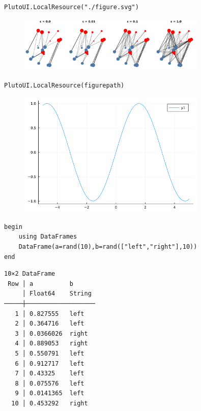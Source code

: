 \begin{lstlisting}[language=JuliaLocal, style=julia]
PlutoUI.LocalResource("./figure.svg")
\end{lstlisting}

\begin{figure}[H]
	\centering
	\includegraphics[width=0.8\textwidth]{./figures/figure}
	\label{fig:/home/davibarreira/MEGA/EMAp/NotebookToLatex.jl/test/pluto/./figure.svg}

\end{figure}

\begin{lstlisting}[language=JuliaLocal, style=julia]
PlutoUI.LocalResource(figurepath)
\end{lstlisting}

\begin{figure}[H]
	\centering
	\includegraphics[width=0.8\textwidth]{./figures/plotexample.png}
	\label{fig:/home/davibarreira/MEGA/EMAp/NotebookToLatex.jl/test/pluto/plotexample.png}

\end{figure}

\begin{lstlisting}[language=JuliaLocal, style=julia]
begin
	using DataFrames
	DataFrame(a=rand(10),b=rand(["left","right"],10))
end
\end{lstlisting}

\begin{verbatim}
10×2 DataFrame
 Row │ a          b
     │ Float64    String
─────┼───────────────────
   1 │ 0.827555   left
   2 │ 0.364716   left
   3 │ 0.0366026  right
   4 │ 0.889053   right
   5 │ 0.550791   left
   6 │ 0.912717   left
   7 │ 0.43325    left
   8 │ 0.075576   left
   9 │ 0.0141365  left
  10 │ 0.453292   right
\end{verbatim}
